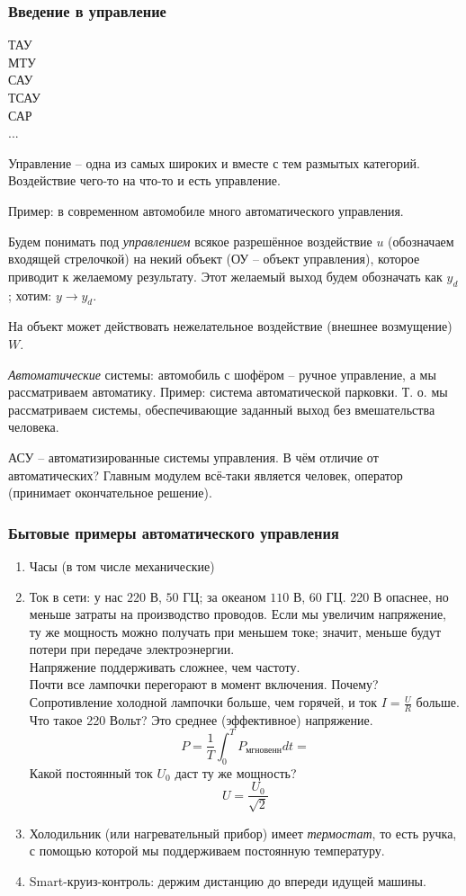 \documentclass[main.tex]{subfiles}
\begin{document}
\subsubsection{Введение в управление}

ТАУ \\
МТУ \\
САУ \\
ТСАУ \\
САР \\
...

Управление -- одна из самых широких и вместе с тем размытых категорий. Воздействие чего-то на что-то и есть управление.

Пример: в современном автомобиле много автоматического управления.

Будем понимать под \emph{управлением} всякое разрешённое воздействие $ u $ (обозначаем входящей стрелочкой) на некий объект (ОУ -- объект управления), которое приводит к желаемому результату.
Этот желаемый выход будем обозначать как $ y_d $; хотим: $ y \to y_d $.

На объект может действовать нежелательное воздействие (внешнее возмущение) $ W $.

\emph{Автоматические} системы: автомобиль с шофёром -- ручное управление, а мы рассматриваем автоматику.
Пример: система автоматической парковки. Т. о. мы рассматриваем системы, обеспечивающие заданный выход без вмешательства человека.

АСУ -- автоматизированные системы управления.
В чём отличие от автоматических?
Главным модулем всё-таки является человек, оператор (принимает окончательное решение).

\subsubsection{Бытовые примеры автоматического управления}

\begin{enumerate}[noitemsep]
    \item Часы (в том числе механические)
    \item Ток в сети: у нас $220$ В, $50$ ГЦ; за океаном $110$ В, $60$ ГЦ. 220 В опаснее, но меньше затраты на производство проводов. Если мы увеличим напряжение, ту же мощность можно получать при меньшем токе; значит, меньше будут потери при передаче электроэнергии. \\
    Напряжение поддерживать сложнее, чем частоту. \\
    Почти все лампочки перегорают в момент включения. Почему? Сопротивление холодной лампочки больше, чем горячей, и ток  $ I = \frac{U}{R} $ больше. \\
    Что такое 220 Вольт? Это среднее (эффективное) напряжение.
    $$ P = \frac{1}{T} \int_0^T P_{\text{мгновенн}} dt =  $$ %
    Какой постоянный ток $ U_0 $ даст ту же мощность?
    $$ U = \frac{U_0}{\sqrt 2} $$
    \item Холодильник (или нагревательный прибор) имеет \emph{термостат}, то есть ручка, с помощью которой мы поддерживаем постоянную температуру.
    \item Smart-круиз-контроль: держим дистанцию до впереди идущей машины.
\end{enumerate}
\end{document}
